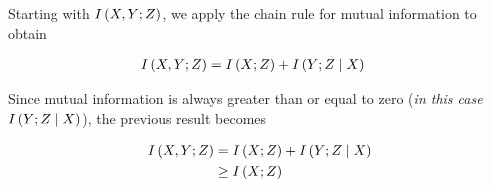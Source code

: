 \documentclass[ClusteringConnectionsMAIN.tex]{subfiles}
\begin{document}
	

  Starting with $I \left( X, Y; Z \right)$, we apply the chain rule for mutual information to obtain

\begin{align}
I \left( X, Y; Z \right) &= I \left( X; Z \right) + I \left( Y; Z \mid X \right)   \notag
\end{align}

Since mutual information is always greater than or equal to zero (\emph{in this case} $I \left( Y; Z \mid X \right)$), the previous result becomes

\begin{align}
I \left( X, Y; Z \right) &= I \left( X; Z \right) + I \left( Y; Z \mid X \right)   \notag  \\
&\geq I \left( X; Z \right)  \notag
\end{align}
\end{document}
